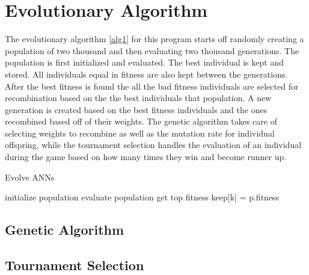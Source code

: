 \section{Evolutionary Algorithm}
The evolutionary algorithm \ref{alg1} for this program starts off randomly creating a population of two thousand and then evaluating two thousand generations. The population is first initialized and evaluated. The best individual is kept and stored. All individuals equal in fitness are also kept between the generations. After the best fitness is found the all the bad fitness individuals are selected for recombination based on the the best individuals that population. A new generation is created based on the best fitness individuals and the ones recombined based off of their weights. The genetic algorithm takes care of selecting weights to recombine as well as the mutation rate for individual offspring, while the tournament selection handles the evaluation of an individual during the game based on how many times they win and become runner up.

\begin{algorithm} [tbh]                     %
\caption{Evolve ANNs}          %
\label{alg1}                           %
\begin{algorithmic}                    %
    \STATE initialize population
    \STATE evaluate population
    	\STATE get top fitness
    				\STATE keep[k] = p.fitness
    			\ENDIF
    		\ENDFOR
    	\ENDFOR
    \ENDFOR
\end{algorithmic}
\end{algorithm}

\subsection{Genetic Algorithm}
\subsection{Tournament Selection}
